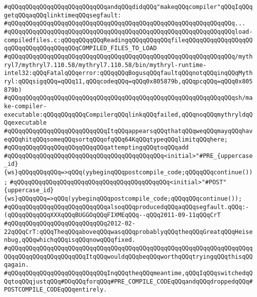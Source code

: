 \verb|#qQQqqQQqqQQqqQQqqQQqqQQqqQQqandqQQqdidqQQq"makeqQQqcompiler"qQQqIqQQqgetqQQqaqQQqlinktimeqQQqsegfault:|\newline
\verb|#qQQqqQQqqQQqqQQqqQQqqQQqqQQqqQQqqQQqqQQqqQQqqQQqqQQqqQQqqQQqqQQq...|\newline
\verb|#qQQqqQQqqQQqqQQqqQQqqQQqqQQqqQQqqQQqqQQqqQQqqQQqqQQqqQQqqQQqqQQqload-compiledfiles.c:qQQqqQQqqQQqReadingqQQqqQQqqQQqfileqQQqqQQqqQQqqQQqqQQqqQQqqQQqqQQqqQQqqQQqCOMPILED_FILES_TO_LOAD|\newline
\verb|#qQQqqQQqqQQqqQQqqQQqqQQqqQQqqQQqqQQqqQQqqQQqqQQqqQQqqQQqqQQqqQQq/mythryl7/mythryl7.110.58/mythryl7.110.58/bin/mythryl-runtime-intel32:qQQqFatalqQQqerror:qQQqqQQqBogusqQQqfaultqQQqnotqQQqinqQQqMythryl:qQQqsigqQQq=qQQq11,qQQqcodeqQQq=qQQq0x805879b,qQQqpcqQQq=qQQq0x805879b)|\newline
\verb|#qQQqqQQqqQQqqQQqqQQqqQQqqQQqqQQqqQQqqQQqqQQqqQQqqQQqqQQqqQQqqQQqsh/make-compiler-executable:qQQqqQQqqQQqCompilerqQQqlinkqQQqfailed,qQQqnoqQQqmythryldqQQqexecutable|\newline
\verb|#qQQqqQQqqQQqqQQqqQQqqQQqqQQqItqQQqappearsqQQqthatqQQqweqQQqmayqQQqhaveqQQqhitqQQqsomeqQQqsortqQQqofqQQq64KqQQqtypeqQQqlimitqQQqhere;|\newline
\verb|#qQQqqQQqqQQqqQQqqQQqqQQqqQQqattemptingqQQqtoqQQqadd|\newline
\verb|#qQQqqQQqqQQqqQQqqQQqqQQqqQQqqQQqqQQqqQQqqQQq<initial>"#PRE_{uppercase_id}{ws}qQQqqQQqqQQq=>qQQq(yybeginqQQqpostcompile_code;qQQqqQQqcontinue());|\newline
\verb|#qQQqqQQqqQQqqQQqqQQqqQQqqQQqqQQqqQQqqQQqqQQq<initial>"#POST"{uppercase_id}{ws}qQQqqQQq=>qQQq(yybeginqQQqpostcompile_code;qQQqqQQqcontinue());|\newline
\verb|#qQQqqQQqqQQqqQQqqQQqqQQqqQQqalsoqQQqproducedqQQqaqQQqsegfault.qQQq:-(qQQqqQQqqQQqXXXqQQqBUGGOqQQqFIXMEqQQq--qQQq2011-09-11qQQqCrT|\newline
\verb|#qQQqqQQqqQQqqQQqqQQqqQQqqQQq2012-02-22qQQqCrT:qQQqTheqQQqaboveqQQqwasqQQqprobablyqQQqtheqQQqGreatqQQqHeisenbug,qQQqwhichqQQqisqQQqnowqQQqfixed.|\newline
\verb|#qQQqqQQqqQQqqQQqqQQqqQQqqQQqqQQqqQQqqQQqqQQqqQQqqQQqqQQqqQQqqQQqqQQqqQQqqQQqqQQqqQQqqQQqqQQqItqQQqwouldqQQqbeqQQqworthqQQqtryingqQQqthisqQQqagain.|\newline
\verb|#qQQqqQQqqQQqqQQqqQQqqQQqqQQqInqQQqtheqQQqmeantime,qQQqIqQQqswitchedqQQqtoqQQqjustqQQq#DOqQQqforqQQq#PRE_COMPILE_CODEqQQqandqQQqdroppedqQQq#POSTCOMPILE_CODEqQQqentirely.|\newline
\newline
